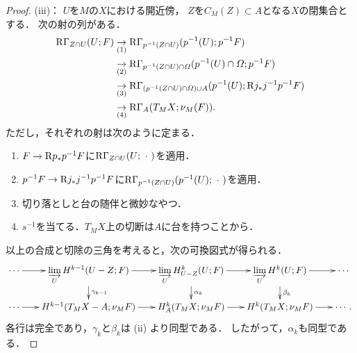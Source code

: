 \begin{proof}
    (iii)：
    \(U\)を\(M\)の\(X\)における開近傍，
    \(Z\)を\(C_{M}(Z)\subset A\)となる\(X\)の閉集合とする．
    次の射の列がある．
    \begin{align*}
        \mathop{\mathrm{R}\hspace{-0pt}\Gamma}\nolimits_{Z\cap U}(U;F)
        &\underset{(1)}{\to}\mathop{\mathrm{R}\hspace{-0pt}\Gamma}\nolimits_{p^{-1}(Z\cap U)}(p^{-1}(U);p^{-1}F)\\
        &\underset{(2)}{\to}\mathop{\mathrm{R}\hspace{-0pt}\Gamma}\nolimits_{p^{-1}(Z\cap U)\cap \varOmega}(p^{-1}(U)\cap \varOmega;p^{-1}F)\\
        &\underset{(3)}{\to}\mathop{\mathrm{R}\hspace{-0pt}\Gamma}\nolimits_{(p^{-1}(Z\cap U)\cap \varOmega)\cup A}(p^{-1}(U);\mathrm{R}{j}_{\ast}j^{-1}p^{-1}F)\\
        &\underset{(4)}{\to}\mathop{\mathrm{R}\hspace{-0pt}\Gamma}\nolimits_{A}(T_{M}X;\nu_{M}(F)).
    \end{align*}
    ただし，それぞれの射は次のように定まる．
    \begin{enumerate}[(1)]
        \item \(F\to \mathrm{R}{p}_{\ast}p^{-1}F\)に\(\mathop{\mathrm{R}\hspace{-0pt}\Gamma}\nolimits_{Z\cap U}(U;\mathord{\ \cdot\ })\)を適用．
        \item \(p^{-1}F\to \mathrm{R}{j}_{\ast}j^{-1}p^{-1}F\)に\(\mathop{\mathrm{R}\hspace{-0pt}\Gamma}\nolimits_{p^{-1}(Z\cap U)}(p^{-1}(U);\mathord{\ \cdot\ })\)を適用．
        \item 切り落としと台の随伴と微妙なやつ．
        \item \(s^{-1}\)を当てる．\(T_{M}X\)上の切断は\(A\)に台を持つことから．
    \end{enumerate}
    以上の合成と切除の三角を考えると，次の可換図式が得られる．
    \[    
        \vcenter{\xymatrix@C=18pt@R=18pt{
        \cdots
        \ar[r]
        &
        \indlim[U]H^{k-1}(U-Z;F)
        \ar[d]^-{\gamma_{k-1}}
        \ar[r]
        &
        \indlim[U]H^{k}_{U-Z}(U;F)
        \ar[r]
        \ar[d]^-{\alpha_k}
        &
        \indlim[U]H^{k}(U;F)
        \ar[r]
        \ar[d]^-{\beta_k}
        &
        \cdots
        \\
        \cdots
        \ar[r]
        &
        H^{k-1}(T_{M}X-A;\nu_{M}F)
        \ar[r]
        &
        H^{k}_{A}(T_{M}X;\nu_{M}F)
        \ar[r]
        &
        H^{k}(T_{M}X;\nu_{M}F)
        \ar[r]
        &
        \cdots.
      }}
    \]
    各行は完全であり，\(\gamma_k\)と\(\beta_k\)は (ii) より同型である．
    したがって，\(\alpha_k\)も同型である．


\end{proof}
